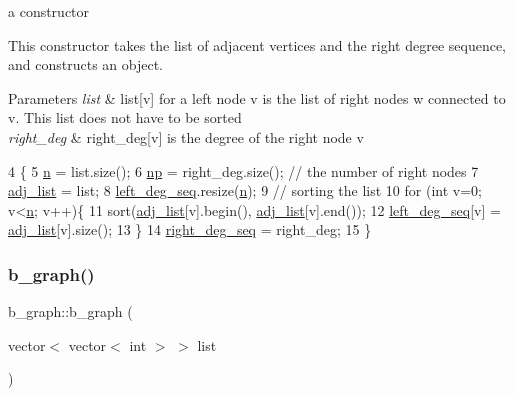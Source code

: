 a constructor 

This constructor takes the list of adjacent vertices and the right degree sequence, and constructs an object. 
\begin{DoxyParams}{Parameters}
{\em list} & list\mbox{[}v\mbox{]} for a left node v is the list of right nodes w connected to v. This list does not have to be sorted \\
\hline
{\em right\+\_\+deg} & right\+\_\+deg\mbox{[}v\mbox{]} is the degree of the right node v \\
\hline
\end{DoxyParams}

\begin{DoxyCode}
4 \{
5   \hyperlink{classb__graph_a9e211d40c1799bc9b125de472ff06642}{n} = list.size();
6   \hyperlink{classb__graph_acffdd5f20329515eb6ec17ad24f1ca64}{np} = right\_deg.size(); \textcolor{comment}{// the number of right nodes}
7   \hyperlink{classb__graph_a2a89d2e8f958270952aab2e8769b7342}{adj\_list} = list;
8   \hyperlink{classb__graph_a311d16462dbb10c47b3a6c80a42139d9}{left\_deg\_seq}.resize(\hyperlink{classb__graph_a9e211d40c1799bc9b125de472ff06642}{n});
9   \textcolor{comment}{// sorting the list}
10   \textcolor{keywordflow}{for} (\textcolor{keywordtype}{int} v=0; v<\hyperlink{classb__graph_a9e211d40c1799bc9b125de472ff06642}{n}; v++)\{
11     sort(\hyperlink{classb__graph_a2a89d2e8f958270952aab2e8769b7342}{adj\_list}[v].begin(), \hyperlink{classb__graph_a2a89d2e8f958270952aab2e8769b7342}{adj\_list}[v].end());
12     \hyperlink{classb__graph_a311d16462dbb10c47b3a6c80a42139d9}{left\_deg\_seq}[v] = \hyperlink{classb__graph_a2a89d2e8f958270952aab2e8769b7342}{adj\_list}[v].size();
13   \}
14   \hyperlink{classb__graph_ae4c875ed6a583a78f38dfe958f20fad5}{right\_deg\_seq} = right\_deg;
15 \}
\end{DoxyCode}
\mbox{\label{classb__graph_af94e3bc6694a312f13c9305ec5ffe4ee}} 
\subsubsection{\texorpdfstring{b\+\_\+graph()}{b\_graph()}\hspace{0.1cm}{\footnotesize\ttfamily [2/2]}}
{\footnotesize\ttfamily b\+\_\+graph\+::b\+\_\+graph (\begin{DoxyParamCaption}\item[{vector$<$ vector$<$ int $>$ $>$}]{list }\end{DoxyParamCaption})}



